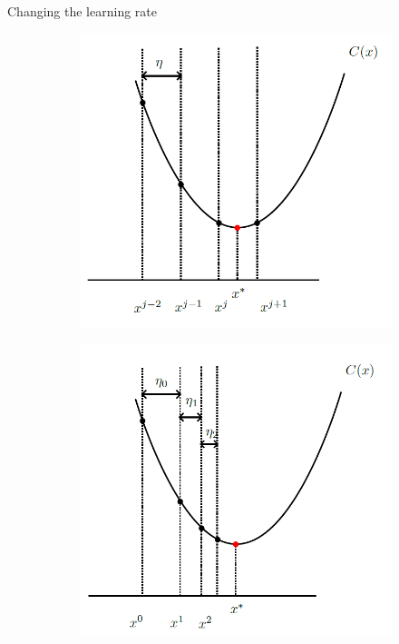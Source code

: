 \documentclass{beamer}
\begin{document}
\begin{frame}{Changing the learning rate}
\begin{figure}[h]
	\centering
	\begin{subfigure}{0.4\textwidth}
		\centering
			\includegraphics[scale=0.4]{../../Figures/fig_const_learning.png}
	\end{subfigure}
	\begin{subfigure}{0.4\textwidth}
		\centering
		\includegraphics[scale=0.4]{../../Figures/fig_variable_learning.png}
	\end{subfigure}
\end{figure}

\end{frame}
\end{document}
